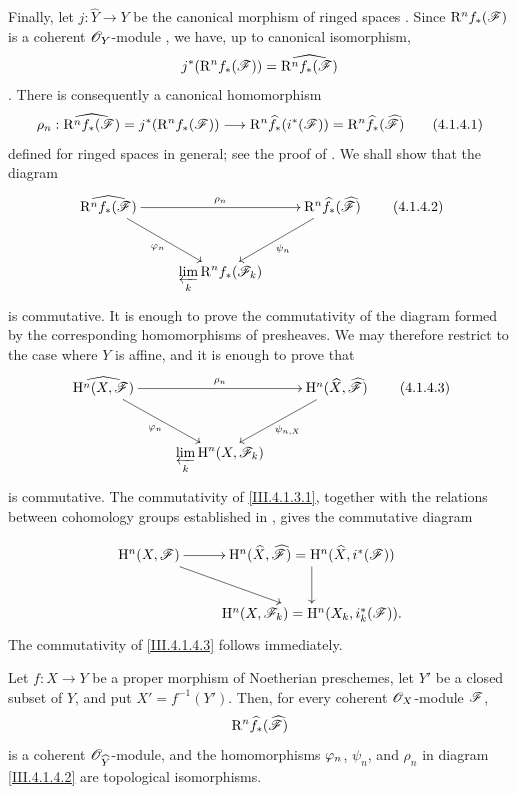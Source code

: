 \begin{env}[4.1.4]
\label{III.4.1.4}
Finally, let $j:\widehat{Y}\to Y$ be the canonical morphism of ringed
spaces .
Since $\mathrm{R}^n f_*(\mathscr{F})$ is a coherent $\mathscr{O}_Y$-module
, we have, up to canonical isomorphism,
\[
  j^*(\mathrm{R}^n f_*(\mathscr{F}))
  =
  \widehat{\mathrm{R}^n f_*(\mathscr{F})}
\]
.
There is consequently a canonical homomorphism
\[
  \rho_n:
  \widehat{\mathrm{R}^n f_*(\mathscr{F})}
  =
  j^*(\mathrm{R}^n f_*(\mathscr{F}))
  \longrightarrow
  \mathrm{R}^n\widehat{f}_*(i^*(\mathscr{F}))
  =
  \mathrm{R}^n\widehat{f}_*(\widehat{\mathscr{F}})
  \tag{4.1.4.1}
  \label{III.4.1.4.1}
\]
defined for ringed spaces in general; see the proof of
.
We shall show that the diagram
\[
  \xymatrix{
    \widehat{\RR^n f_*(\sh{F})}
      \ar[rr]^{\rho_n}\ar[dr]_{\vphi_n}
    &&
    \RR^n\widehat{f}_*(\widehat{\sh{F}})
      \ar[dl]^{\psi_n}\\
    &
    \displaystyle\varprojlim_k\RR^n f_*(\sh{F}_k)
    &
  }
  \tag{4.1.4.2}
  \label{III.4.1.4.2}
\]
is commutative.
It is enough to prove the commutativity of the diagram formed by the
corresponding homomorphisms of presheaves.
We may therefore restrict to the case where $Y$ is affine, and it is
enough to prove that
\[
  \xymatrix{
    \widehat{\HH^n(X,\sh{F})}
      \ar[rr]^{\rho_n}\ar[dr]_{\vphi_n}
    &&
    \HH^n(\widehat{X},\widehat{\sh{F}})
      \ar[dl]^{\psi_{n,X}}\\
    &
    \displaystyle\varprojlim_k\HH^n(X,\sh{F}_k)
    &
  }
  \tag{4.1.4.3}
  \label{III.4.1.4.3}
\]
is commutative.
The commutativity of \eqref{III.4.1.3.1}, together with the relations
between cohomology groups established in , gives the
commutative diagram


\[
  \xymatrix{
    \HH^n(X,\sh{F})
      \ar[r]\ar[dr]
    &
    \HH^n(\widehat{X},\widehat{\sh{F}})
      =
    \HH^n(\widehat{X},i^*(\sh{F}))
      \ar[d]\\
    &
    \HH^n(X,\sh{F}_k)
      =
    \HH^n(X_k,i_k^*(\sh{F})).
  }
\]
The commutativity of \eqref{III.4.1.4.3} follows immediately.
\end{env}

\begin{theorem}[4.1.5]
\label{III.4.1.5}
Let $f:X\to Y$ be a proper morphism of Noetherian preschemes, let
$Y'$ be a closed subset of $Y$, and put $X'=f^{-1}(Y')$.
Then, for every coherent $\mathscr{O}_X$-module $\mathscr{F}$,
\[
  \mathrm{R}^n\widehat{f}_*(\widehat{\mathscr{F}})
\]
is a coherent $\mathscr{O}_{\widehat{Y}}$-module, and the homomorphisms
$\varphi_n$, $\psi_n$, and $\rho_n$ in diagram
\eqref{III.4.1.4.2} are topological isomorphisms.
\end{theorem}

